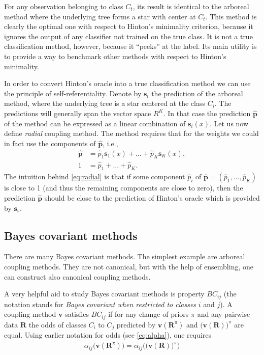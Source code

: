 For any observation belonging to class $C_t$, its result is identical to the arboreal method where the underlying tree forms a star with center at $C_t$. This method is clearly the optimal one with respect to Hinton's minimality criterion, because it ignores the output of any classifier not trained on the true class. It is not a true classification method, however, because it ``peeks'' at the label. Its main utility is to provide a way to benchmark other methods with respect to Hinton's minimality.

In order to convert Hinton's oracle into a true classification method we can use the principle of self-referentiality.  Denote by $\boldsymbol{s}_i$ the prediction of the arboreal method, where the underlying tree is a star centered at the class $C_i$. The predictions will generally span the vector space $R^K$. In that case the prediction $\hat{\boldsymbol{p}}$ of the method  can be expressed as a linear combination of $\boldsymbol{s}_i(x)$. Let us now define \emph{radial} coupling method. The  method requires that for the  weights we could in fact use the components of $\hat{\boldsymbol{p}}$, i.e.,
\begin{equation}
	\begin{split}
	\hat {\boldsymbol{p}} &= \hat p_1 \boldsymbol{s}_1(x) + \ldots + \hat p_K \boldsymbol{s}_K(x),\\
	1 &= \hat p_1 + \ldots + \hat p_K.
	\end{split}
	 \label{eq:radial}
\end{equation}
%
The intuition behind \eqref{eq:radial} is that if some component $\hat p_i$ of $\hat{\boldsymbol{p}} =(\hat p_1, \ldots, \hat p_K) $ is close to 1 (and thus the remaining components are close to zero), then the prediction $\hat{\boldsymbol{p}}$ should be close to the prediction of Hinton's oracle which is provided by ${\boldsymbol{s}}_i$.

\subsection{Bayes covariant methods} \label{sec:bc2}

There are many Bayes covariant methods. The simplest example are arboreal coupling methods. They are not canonical, but with the help of ensembling, one can construct also canonical coupling methods. 

A very helpful aid to study Bayes covariant methods is property $BC_{ij}$ (the notation stands for \emph{Bayes covariant when restricted to classes} $i$ and $j$). A coupling method $\boldsymbol{v}$ satisfies $BC_{ij}$ if for any change of priors $\pi$ and any  pairwise data $\boldsymbol{R}$ the odds of classes $C_i$ to $C_j$ predicted by $\boldsymbol{v}(\boldsymbol{R}^\pi)$ and $\bigl(\boldsymbol{v}(\boldsymbol{R})\bigr)^\pi$ are equal. Using earlier notation for odds (see \eqref{eq:alpha}), one requires
\begin{align}
	\alpha_{ij} \bigl(\boldsymbol{v}(\boldsymbol{R}^\pi) \bigr) = \alpha_{ij}\biggl( \bigl(\boldsymbol{v}(\boldsymbol{R}) \bigr)^\pi\biggr)
\end{align}

